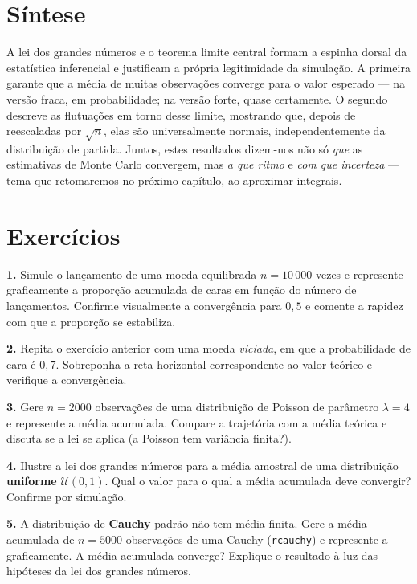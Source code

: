 \documentclass[
  portuguese,
  11pt,
  openany]{book}
\begin{document}
\section{Síntese}\label{suxedntese-1}

A lei dos grandes números e o teorema limite central formam a espinha dorsal da
estatística inferencial e justificam a própria legitimidade da simulação. A
primeira garante que a média de muitas observações converge para o valor
esperado --- na versão fraca, em probabilidade; na versão forte, quase certamente.
O segundo descreve as flutuações em torno desse limite, mostrando que, depois de
reescaladas por \(\sqrt{n}\), elas são universalmente normais, independentemente da
distribuição de partida. Juntos, estes resultados dizem-nos não só \emph{que} as
estimativas de Monte Carlo convergem, mas \emph{a que ritmo} e \emph{com que incerteza} ---
tema que retomaremos no próximo capítulo, ao aproximar integrais.

\section{Exercícios}\label{exercuxedcios-36}

\textbf{1.} Simule o lançamento de uma moeda equilibrada \(n = 10\,000\) vezes e
represente graficamente a proporção acumulada de caras em função do número de
lançamentos. Confirme visualmente a convergência para \(0{,}5\) e comente a
rapidez com que a proporção se estabiliza.

\textbf{2.} Repita o exercício anterior com uma moeda \emph{viciada}, em que a
probabilidade de cara é \(0{,}7\). Sobreponha a reta horizontal correspondente ao
valor teórico e verifique a convergência.

\textbf{3.} Gere \(n = 2000\) observações de uma distribuição de Poisson de parâmetro
\(\lambda = 4\) e represente a média acumulada. Compare a trajetória com a média
teórica e discuta se a lei se aplica (a Poisson tem variância finita?).

\textbf{4.} Ilustre a lei dos grandes números para a média amostral de uma
distribuição \textbf{uniforme} \(\mathcal{U}(0,1)\). Qual o valor para o qual a média
acumulada deve convergir? Confirme por simulação.

\textbf{5.} A distribuição de \textbf{Cauchy} padrão não tem média finita. Gere a média
acumulada de \(n = 5000\) observações de uma Cauchy (\texttt{rcauchy}) e represente-a
graficamente. A média acumulada converge? Explique o resultado à luz das
hipóteses da lei dos grandes números.
\end{document}
